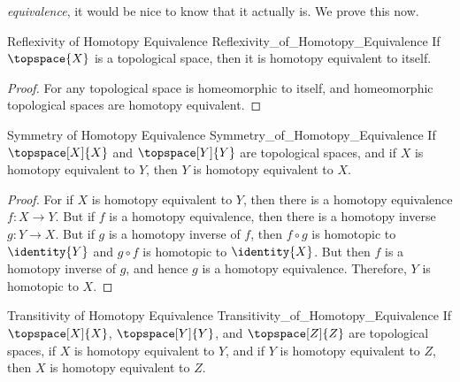 \documentclass{book}                                                           %
\begin{document}
                \textit{equivalence}, it would be nice to know that it actually
                is. We prove this now.
                \begin{ltheorem}{Reflexivity of Homotopy Equivalence}
                                {Reflexivity_of_Homotopy_Equivalence}
                    If $\topspace{X}$ is a topological space, then it is
                    homotopy equivalent to itself.
                \end{ltheorem}
                \begin{proof}
                    For any topological space is homeomorphic to itself, and
                    homeomorphic topological spaces are homotopy equivalent.
                \end{proof}
                \begin{ltheorem}{Symmetry of Homotopy Equivalence}
                                {Symmetry_of_Homotopy_Equivalence}
                    If $\topspace[X]{X}$ and $\topspace[Y]{Y}$ are topological
                    spaces, and if $X$ is homotopy equivalent to $Y$, then
                    $Y$ is homotopy equivalent to $X$.
                \end{ltheorem}
                \begin{proof}
                    For if $X$ is homotopy equivalent to $Y$, then there is a
                    homotopy equivalence $f:X\rightarrow{Y}$. But if $f$ is a
                    homotopy equivalence, then there is a homotopy inverse
                    $g:Y\rightarrow{X}$. But if $g$ is a homotopy inverse of
                    $f$, then $f\circ{g}$ is homotopic to $\identity{Y}$ and
                    $g\circ{f}$ is homotopic to $\identity{X}$. But then $f$ is
                    a homotopy inverse of $g$, and hence $g$ is a homotopy
                    equivalence. Therefore, $Y$ is homotopic to $X$.
                \end{proof}
                \begin{ltheorem}{Transitivity of Homotopy Equivalence}
                                {Transitivity_of_Homotopy_Equivalence}
                    If $\topspace[X]{X}$, $\topspace[Y]{Y}$, and
                    $\topspace[Z]{Z}$ are topological spaces, if $X$ is homotopy
                    equivalent to $Y$, and if $Y$ is homotopy equivalent to $Z$,
                    then $X$ is homotopy equivalent to $Z$.
                \end{ltheorem}
\end{document}
